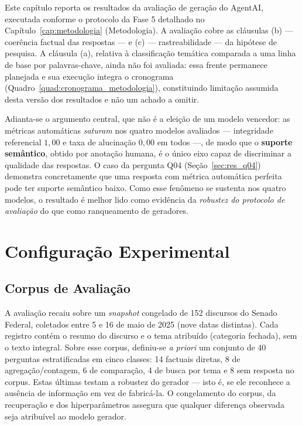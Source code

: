 Este capítulo reporta os resultados da avaliação de geração do AgentAI, executada conforme o protocolo da Fase 5 detalhado no Capítulo~\ref{cap:metodologia} (Metodologia). A avaliação cobre as cláusulas (b) --- coerência factual das respostas --- e (c) --- rastreabilidade --- da hipótese de pesquisa. A cláusula (a), relativa à classificação temática comparada a uma linha de base por palavras-chave, ainda não foi avaliada: essa frente permanece planejada e sua execução integra o cronograma (Quadro~\ref{quad:cronograma_metodologia}), constituindo limitação assumida desta versão dos resultados e não um achado a omitir.

Adianta-se o argumento central, que não é a eleição de um modelo vencedor: as métricas automáticas \textit{saturam} nos quatro modelos avaliados --- integridade referencial $1{,}00$ e taxa de alucinação $0{,}00$ em todos ---, de modo que o \textbf{suporte semântico}, obtido por anotação humana, é o único eixo capaz de discriminar a qualidade das respostas. O caso da pergunta Q04 (Seção~\ref{sec:res_q04}) demonstra concretamente que uma resposta com métrica automática perfeita pode ter suporte semântico baixo. Como esse fenômeno se sustenta nos quatro modelos, o resultado é melhor lido como evidência da \textit{robustez do protocolo de avaliação} do que como ranqueamento de geradores.

\section{Configuração Experimental}

\subsection{Corpus de Avaliação}
A avaliação recaiu sobre um \textit{snapshot} congelado de 152 discursos do Senado Federal, coletados entre 5 e 16 de maio de 2025 (nove datas distintas). Cada registro contém o resumo do discurso e o tema atribuído (categoria fechada), sem o texto integral. Sobre esse corpus, definiu-se \textit{a priori} um conjunto de 40 perguntas estratificadas em cinco classes: 14 factuais diretas, 8 de agregação/contagem, 6 de comparação, 4 de busca por tema e 8 sem resposta no corpus. Estas últimas testam a robustez do gerador --- isto é, se ele reconhece a ausência de informação em vez de fabricá-la. O congelamento do corpus, da recuperação e dos hiperparâmetros assegura que qualquer diferença observada seja atribuível ao modelo gerador.

